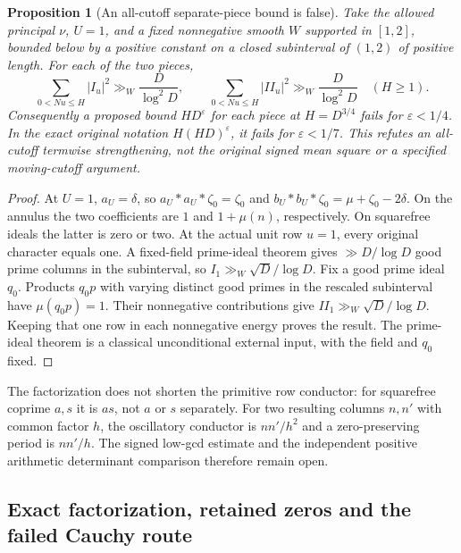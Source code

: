 \documentclass[11pt,oneside,openany]{book}
\newtheorem{proposition}[theorem]{Proposition}
\theoremstyle{definition}\newtheorem{definition}[theorem]{Definition}
\theoremstyle{remark}\newtheorem{remark}[theorem]{Remark}
\begin{document}
\begin{proposition}[An all-cutoff separate-piece bound is false]
\label{prop:mobius-unit-cutoff}
Take the allowed principal $\nu$, $U=1$, and a fixed nonnegative smooth
$W$ supported in $[1,2]$, bounded below by a positive constant on a closed
subinterval of $(1,2)$ of positive length.
For each of the two pieces,
\[
 \sum_{0<Nu\le H}|I_u|^2\gg_W\frac{D}{\log^2D},\qquad
 \sum_{0<Nu\le H}|II_u|^2\gg_W\frac{D}{\log^2D}
 \quad(H\ge1).
\]
Consequently a proposed bound $H D^\varepsilon$ for each piece at
$H=D^{3/4}$ fails for $\varepsilon<1/4$. In the exact original notation
$H(HD)^\varepsilon$, it fails for $\varepsilon<1/7$.
This refutes an all-cutoff termwise strengthening, not the original signed
mean square or a specified moving-cutoff argument.
\end{proposition}
\begin{proof}
At $U=1$, $a_U=\delta$, so $a_U*a_U*\zeta_0=\zeta_0$ and
$b_U*b_U*\zeta_0=\mu+\zeta_0-2\delta$.
On the annulus the two coefficients are $1$ and $1+\mu(n)$, respectively.
On squarefree ideals the latter is zero or two. At the actual unit row
$u=1$, every original character equals one. A fixed-field prime-ideal
theorem gives $\gg D/\log D$ good prime columns in the subinterval,
so $I_1\gg_W\sqrt D/\log D$. Fix a good prime ideal $q_0$.
Products $q_0p$ with varying distinct good primes in the rescaled
subinterval have $\mu(q_0p)=1$. Their nonnegative contributions give
$II_1\gg_W\sqrt D/\log D$. Keeping that one row in each nonnegative
energy proves the result. The prime-ideal theorem is a classical
unconditional external input, with the field and $q_0$ fixed.
\end{proof}

The factorization does not shorten the primitive row conductor:
for squarefree coprime $a,s$ it is $as$, not $a$ or $s$ separately.
For two resulting columns $n,n'$ with common factor $h$, the oscillatory
conductor is $nn'/h^2$ and a zero-preserving period is $nn'/h$.
The signed low-gcd estimate and the independent positive arithmetic
determinant comparison therefore remain open.

\subsection{Exact factorization, retained zeros and the failed Cauchy route}
\label{sec:mobius-split-details}
\end{document}
